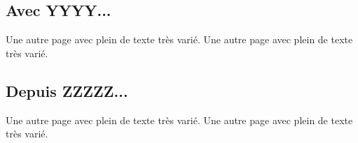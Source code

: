         \subsection{Avec YYYY...}
            Une autre page avec plein de texte très varié.
            Une autre page avec plein de texte très varié.

        \subsection{Depuis ZZZZZ...}
            Une autre page avec plein de texte très varié.
            Une autre page avec plein de texte très varié.